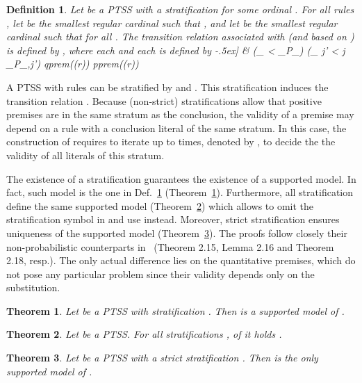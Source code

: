 \documentclass[submission,copyright,creativecommons]{eptcs}
\newtheorem{definition}{Definition}
\newtheorem{theorem}{Theorem}
\newcommand{\trans}[1][]{\xrightarrow{\, {#1} \, }}
\newcommand{\pprem}[1]{\textrm{pprem}(#1)}
\newcommand{\qprem}[1]{\textrm{qprem}(#1)}
\begin{document}
\begin{definition}\label{def:assoc_with}Let  be a PTSS with a stratification
   for some ordinal .
For all rules , let  be the smallest regular cardinal
  such that , 
  and let  be the smallest
  regular cardinal such that  for all
  .
The transition relation  \emph{associated with} 
  (and based on ) is defined by
,
where each  and each  is defined
  by
-.5ex]
  & \qquad \textstyle (\bigcup_{ \gamma < \beta} {\trans_{P_\gamma}}) \cup (\bigcup_{ j' < j} {\trans_{P_{\beta,j'}}}) \models
       {\qprem{\rho(r)} \cup \pprem{\rho(r)}}   \
\end{definition}
\noindent
A PTSS  with rules 
can be stratified by  and .  This stratification induces the
transition relation . Because 
(non-strict) stratifications allow that positive premises are in the same
stratum as the conclusion, the validity of a premise may depend on a rule with a conclusion 
literal of the same stratum.
In this case, the construction of  requires
to iterate up to   times, denoted by ,
to decide the the validity of all literals of this stratum.

The  existence of a stratification guarantees the existence of a
supported model. In fact, such model is the one in
Def.~\ref{def:assoc_with} (Theorem~\ref{th:existence:supmodel}). Furthermore,
all stratification define the same supported model (Theorem~\ref{th:weakunicity:supmodel}) which allows to omit the stratification
symbol in  and use  instead. Moreover, 
strict stratification ensures uniqueness of the supported model 
(Theorem~\ref{th:strongunicity:supmodel}). The proofs follow closely
their non-probabilistic counterparts in~\cite{Groote93} (Theorem
2.15, Lemma 2.16 and Theorem 2.18, resp.).
The only actual difference lies on the quantitative premises, which do
not pose any particular problem since their validity depends only on
the substitution.


\begin{theorem}\label{th:existence:supmodel}Let  be a PTSS with stratification . Then  is a supported model of . 
\end{theorem}

\begin{theorem}\label{th:weakunicity:supmodel}Let  be a PTSS. For all stratifications ,  of  it holds .
\end{theorem}

\begin{theorem}\label{th:strongunicity:supmodel}Let  be a PTSS with a strict stratification . Then  is the only supported model of .
\end{theorem}
\end{document}
